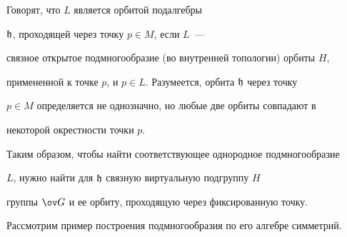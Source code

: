 Говорят, что $L$ является орбитой подалгебры


$\frak h$, проходящей через точку $p\in M$, если $L$~---


связное открытое подмногообразие (во внутренней топологии) орбиты $H$,


примененной к точке $p$, и $p\in L$. Разумеется, орбита $\frak h$ через точку


$p\in M$ определяется не однозначно, но любые две орбиты совпадают в


некоторой окрестности точки $p$.





Таким образом, чтобы найти соответствующее однородное подмногообразие


$L$, нужно найти для $\frak h$ связную виртуальную подгруппу $H$ 


группы $\Gb$ и ее орбиту, проходящую через фиксированную точку.


Рассмотрим пример построения подмногообразия по его алгебре симметрий.






